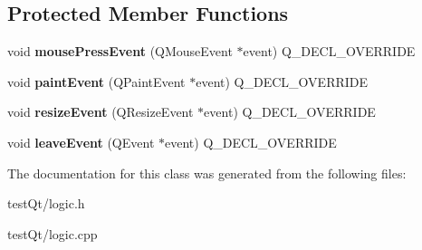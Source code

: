 \subsection*{Protected Member Functions}
\begin{DoxyCompactItemize}
\item 
\hypertarget{classlogic_a6a12964d5c28d729acba713550bdba43}{}\label{classlogic_a6a12964d5c28d729acba713550bdba43} 
void {\bfseries mouse\+Press\+Event} (Q\+Mouse\+Event $\ast$event) Q\+\_\+\+D\+E\+C\+L\+\_\+\+O\+V\+E\+R\+R\+I\+DE
\item 
\hypertarget{classlogic_acb187bd764b1c2478c9a0792268c849e}{}\label{classlogic_acb187bd764b1c2478c9a0792268c849e} 
void {\bfseries paint\+Event} (Q\+Paint\+Event $\ast$event) Q\+\_\+\+D\+E\+C\+L\+\_\+\+O\+V\+E\+R\+R\+I\+DE
\item 
\hypertarget{classlogic_a9d4eb2785a9b5ba90667ea917af0214f}{}\label{classlogic_a9d4eb2785a9b5ba90667ea917af0214f} 
void {\bfseries resize\+Event} (Q\+Resize\+Event $\ast$event) Q\+\_\+\+D\+E\+C\+L\+\_\+\+O\+V\+E\+R\+R\+I\+DE
\item 
\hypertarget{classlogic_aee48c6aa61703aa595a25e99ea8f18e6}{}\label{classlogic_aee48c6aa61703aa595a25e99ea8f18e6} 
void {\bfseries leave\+Event} (Q\+Event $\ast$event) Q\+\_\+\+D\+E\+C\+L\+\_\+\+O\+V\+E\+R\+R\+I\+DE
\end{DoxyCompactItemize}


The documentation for this class was generated from the following files\+:\begin{DoxyCompactItemize}
\item 
test\+Qt/logic.\+h\item 
test\+Qt/logic.\+cpp\end{DoxyCompactItemize}
